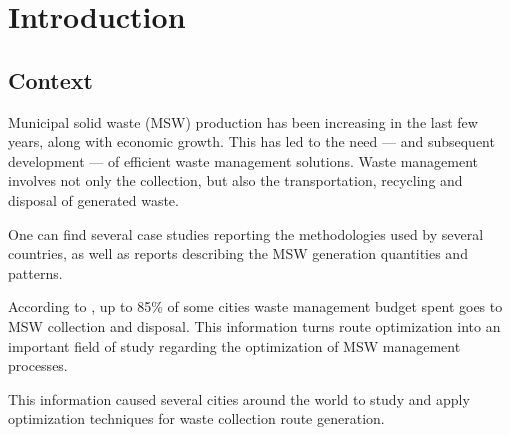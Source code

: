 \chapter{Introduction} \label{chap:intro}

\section*{}


\section{Context}

Municipal solid waste (MSW) production has been increasing in the last few
years, along with economic growth\citep{McCarthy94}. This has led to the need
--- and subsequent development --- of efficient waste management solutions.
Waste management involves not only the collection, but also the transportation,
recycling and disposal of generated waste.

One can find several case studies reporting the methodologies used by several
countries, as well as reports describing the MSW generation quantities and
patterns.

According to \citet{Bhat1996}, up to 85\% of some cities waste management
budget spent goes to MSW collection and disposal. This information turns route
optimization into an important field of study regarding the optimization of MSW
management processes.

This information caused several cities around the world to study and apply
optimization techniques for waste collection route generation.

